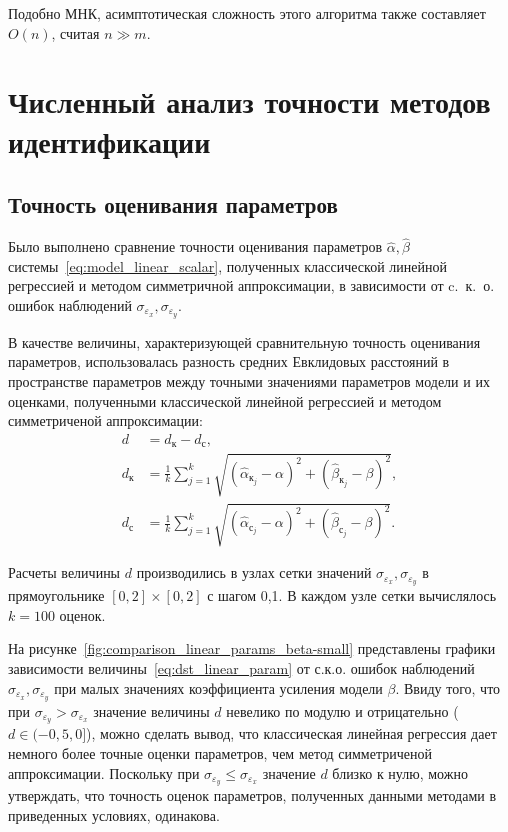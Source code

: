 Подобно МНК, асимптотическая сложность этого алгоритма также составляет \( O(n) \),
считая \( n \gg m \).


\section{Численный анализ точности методов идентификации}

\subsection{Точность оценивания параметров}

Было выполнено сравнение точности оценивания параметров
\( \hat{\alpha}, \hat{\beta} \) системы~\eqref{eq:model_linear_scalar},
полученных классической линейной регрессией и методом симметричной аппроксимации,
в зависимости от c.~к.~о. ошибок наблюдений \( \sigma_{\varepsilon_x}, \sigma_{\varepsilon_y} \).

В качестве величины, характеризующей сравнительную точность оценивания параметров,
использовалась разность средних Евклидовых расстояний в пространстве параметров
между точными значениями параметров модели и их оценками,
полученными классической линейной регрессией и методом симметриченой аппроксимации:
\begin{equation}
  \begin{aligned}
    d &= d_{\text{к}} - d_{\text{с}}, \\
    d_{\text{к}} &= \frac{1}{k} \sum_{j=1}^k \sqrt{(\hat{\alpha}_{\text{к}_j} - \alpha)^2 + (\hat{\beta}_{\text{к}_j} - \beta)^2}, \\
    d_{\text{с}} &= \frac{1}{k} \sum_{j=1}^k \sqrt{(\hat{\alpha}_{\text{с}_j} - \alpha)^2 + (\hat{\beta}_{\text{с}_j} - \beta)^2}.
    \end{aligned}
  \label{eq:dst_linear_param}
\end{equation}

Расчеты величины \( d \) производились в узлах сетки значений
\( \sigma_{\varepsilon_x}, \sigma_{\varepsilon_y} \) в прямоугольнике
\( [0, 2] \times [0, 2] \) с шагом 0{,}1.
В каждом узле сетки вычислялось \( k = 100 \) оценок.

На рисунке~\ref{fig:comparison_linear_params_beta-small}
представлены графики зависимости величины~\eqref{eq:dst_linear_param}
от с.к.о. ошибок наблюдений \( \sigma_{\varepsilon_x}, \sigma_{\varepsilon_y} \) при
малых значениях коэффициента усиления модели \( \beta \).
Ввиду того, что при \( \sigma_{\varepsilon_y} > \sigma_{\varepsilon_x} \)
значение величины \( d \) невелико по модулю и отрицательно (\( d \in ( -0{,}5, 0 ] \)),
можно сделать вывод, что классическая линейная регрессия дает немного более точные оценки параметров,
чем метод симметриченой аппроксимации.
Поскольку при \( \sigma_{\varepsilon_y} \le \sigma_{\varepsilon_x} \) значение
\( d \) близко к нулю, можно утверждать, что точность оценок параметров,
полученных данными методами в приведенных условиях, одинакова.

